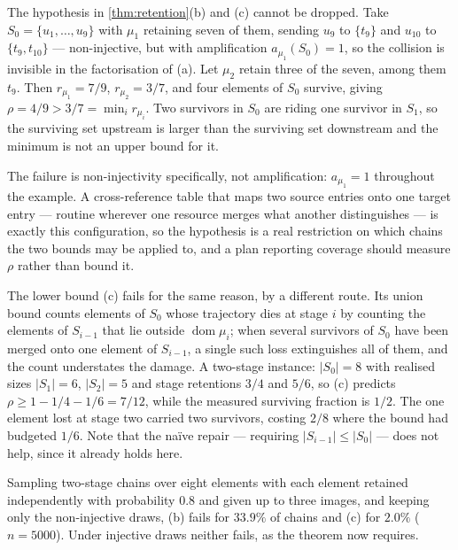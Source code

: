\begin{remark}
\label{rem:injectivity-needed}
The hypothesis in \cref{thm:retention}(b) and (c) cannot be dropped. Take
$S_0 = \{u_1,\dots,u_9\}$ with $\mu_1$ retaining seven of them, sending $u_9$
to $\{t_9\}$ and $u_{10}$ to $\{t_9, t_{10}\}$ --- non-injective, but with
amplification $a_{\mu_1}(S_0) = 1$, so the collision is invisible in the
factorisation of (a). Let $\mu_2$ retain three of the seven, among them $t_9$.
Then $r_{\mu_1} = 7/9$, $r_{\mu_2} = 3/7$, and four elements of $S_0$ survive,
giving $\rho = 4/9 > 3/7 = \min_i r_{\mu_i}$. Two survivors in $S_0$ are riding
one survivor in $S_1$, so the surviving set upstream is larger than the
surviving set downstream and the minimum is not an upper bound for it.

The failure is non-injectivity specifically, not amplification: $a_{\mu_1} = 1$
throughout the example. A cross-reference table that maps two source entries
onto one target entry --- routine wherever one resource merges what another
distinguishes --- is exactly this configuration, so the hypothesis is a real
restriction on which chains the two bounds may be applied to, and a plan
reporting coverage should measure $\rho$ rather than bound it.

The lower bound (c) fails for the same reason, by a different route. Its union
bound counts elements of $S_0$ whose trajectory dies at stage $i$ by counting
the elements of $S_{i-1}$ that lie outside $\operatorname{dom}\mu_i$; when
several survivors of $S_0$ have been merged onto one element of $S_{i-1}$, a
single such loss extinguishes all of them, and the count understates the
damage. A two-stage instance: $|S_0| = 8$ with realised sizes
$|S_1| = 6$, $|S_2| = 5$ and stage retentions $3/4$ and $5/6$, so (c) predicts
$\rho \geq 1 - 1/4 - 1/6 = 7/12$, while the measured surviving fraction is
$1/2$. The one element lost at stage two carried two survivors, costing $2/8$
where the bound had budgeted $1/6$. Note that the na\"ive repair ---
requiring $|S_{i-1}| \leq |S_0|$ --- does not help, since it already holds here.

Sampling two-stage chains over eight elements with each element retained
independently with probability $0.8$ and given up to three images, and keeping
only the non-injective draws, (b) fails for $33.9\%$ of chains and (c) for
$2.0\%$ ($n = 5000$). Under injective draws neither fails, as the theorem now
requires.
\end{remark}

